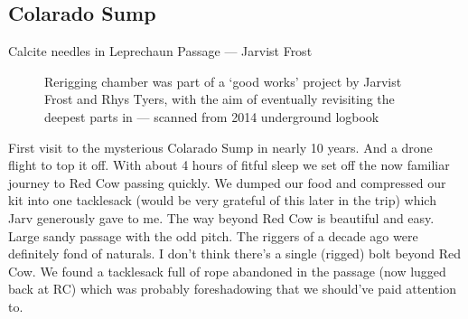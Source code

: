 \subsection{Colarado Sump}


       
\begin{marginfigure}
        \centering
        \caption{Calcite needles in Leprechaun Passage --- Jarvist Frost} \label{more calcite needles}
\end{marginfigure}

\begin{figure}[t]
	\checkoddpage \ifoddpage \forcerectofloat \else \forceversofloat \fi
    		\centering
    
   		\caption{Rerigging \protect{} chamber was part of a `good works' project by Jarvist Frost and Rhys Tyers, with the aim of eventually revisiting the deepest parts in \protect{}
    		 --- scanned from 2014 underground logbook}
		 \label{scan}
\end{figure}
          
First visit to the mysterious Colarado Sump in nearly 10 years. And a drone flight to top it off. With about 4 hours of fitful sleep we set off the now familiar journey to Red Cow passing quickly. We dumped our food and compressed our kit into one tacklesack (would be very grateful of this later in the trip) which Jarv generously gave to me.
The way beyond Red Cow is beautiful and easy. Large sandy passage with the odd pitch. The riggers of a decade ago were definitely fond of naturals. I don't think there's a single (rigged) bolt beyond Red Cow. We found a tacklesack full of rope abandoned in the passage (now lugged back at RC) which was probably foreshadowing that we should've paid attention to. 

        
 
          


